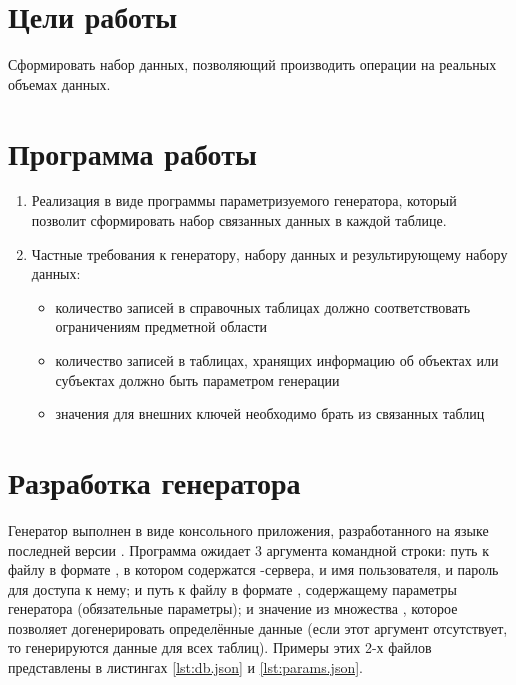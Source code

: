 





\tableofcontents
\newpage

\section{Цели работы}

Сформировать набор данных, позволяющий производить операции на реальных объемах данных. 

\section{Программа работы}

\begin{enumerate}
	\item Реализация в виде программы параметризуемого генератора, который позволит сформировать набор связанных данных в каждой таблице.
	\item Частные требования к генератору, набору данных и результирующему набору данных:
	\begin{itemize}
		\item количество записей в справочных таблицах должно соответствовать ограничениям предметной области
		\item количество записей в таблицах, хранящих информацию об объектах или субъектах должно быть параметром генерации
		\item значения для внешних ключей необходимо брать из связанных таблиц
	\end{itemize}
 
\end{enumerate}
 
\section{Разработка генератора} 

Генератор выполнен в виде консольного приложения, разработанного на языке  последней версии . Программа ожидает 3 аргумента командной строки: путь к файлу в формате , в котором содержатся  -сервера, и имя пользователя, и пароль для доступа к нему; и путь к файлу в формате , содержащему параметры генератора (обязательные параметры); и значение из множества , которое позволяет догенерировать определённые данные (если этот аргумент отсутствует, то генерируются данные для всех таблиц). Примеры этих 2-х файлов представлены в листингах \ref{lst:db.json} и \ref{lst:params.json}.


